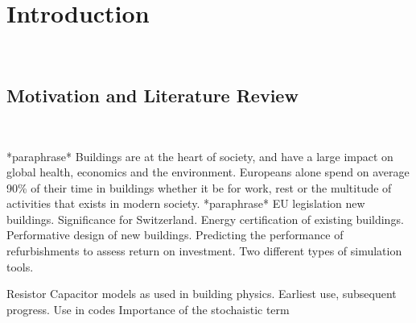 
\chapter{Introduction}\
\label{ch:introduction}



\section{Motivation and Literature Review}\
\label{ch:motivation}

*paraphrase* Buildings are at the heart of society, and have a large impact on global health, economics and the environment. Europeans alone spend on average 90\% of their time in buildings \cite{Staniaszek2014BPIE} whether it be for work, rest or the multitude of activities that exists in modern society. *paraphrase* EU legislation new buildings. Significance for Switzerland.
Energy certification of existing buildings. Performative design of new buildings. Predicting the performance of refurbishments to assess return on investment. Two different types of simulation tools.
\item
Resistor Capacitor models as used in building physics. Earliest use, subsequent progress. Use in codes
Importance of the stochaistic term



 

